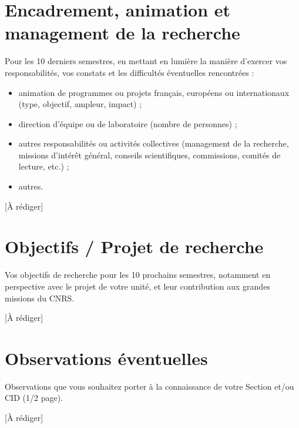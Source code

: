 \documentclass[10pt,a4paper]{article}
\newcommand{\arediger}{\textcolor{gris}{[À rédiger]}}
\begin{document}
\section{Encadrement, animation et management de la recherche}
\begin{consigne}
Pour les 10 derniers semestres, en mettant en lumière la manière d'exercer vos responsabilités, vos constats et les difficultés éventuelles rencontrées :
\begin{itemize}
  \item animation de programmes ou projets français, européens ou internationaux (type, objectif, ampleur, impact) ;
  \item direction d'équipe ou de laboratoire (nombre de personnes) ;
  \item autres responsabilités ou activités collectives (management de la recherche, missions d'intérêt général, conseils scientifiques, commissions, comités de lecture, etc.) ;
  \item autres.
\end{itemize}
\end{consigne}
\arediger %

\section{Objectifs / Projet de recherche}
\begin{consigne}
Vos objectifs de recherche pour les 10 prochains semestres, notamment en perspective avec le projet de votre unité, et leur contribution aux grandes missions du CNRS.
\end{consigne}
\arediger %

\section{Observations éventuelles}
\begin{consigne}
Observations que vous souhaitez porter à la connaissance de votre Section et/ou CID (1/2 page).
\end{consigne}
\arediger %
\end{document}
